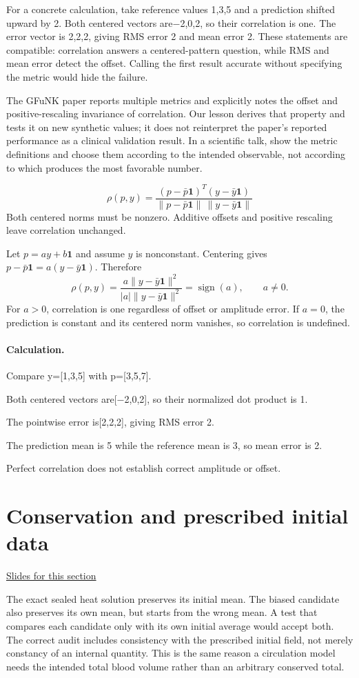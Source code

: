 \documentclass[11pt,letterpaper]{article}
\theoremstyle{definition}\newtheorem{definition}{Definition}\newtheorem{example}{Example}
\numberwithin{equation}{section}
\begin{document}
For a concrete calculation, take reference values 1,3,5 and a prediction shifted upward by 2. Both centered vectors are\ensuremath{-}2,0,2, so their correlation is one. The error vector is 2,2,2, giving RMS error 2 and mean error 2. These statements are compatible: correlation answers a centered-pattern question, while RMS and mean error detect the offset. Calling the first result accurate without specifying the metric would hide the failure.

The GFuNK paper reports multiple metrics and explicitly notes the offset and positive-rescaling invariance of correlation. Our lesson derives that property and tests it on new synthetic values; it does not reinterpret the paper's reported performance as a clinical validation result. In a scientific talk, show the metric definitions and choose them according to the intended observable, not according to which produces the most favorable number.

\[
\rho(p,y)=\frac{(p-\bar p\mathbf1)^T(y-\bar y\mathbf1)}{\|p-\bar p\mathbf1\|\,\|y-\bar y\mathbf1\|}
\]
Both centered norms must be nonzero. Additive offsets and positive rescaling leave correlation unchanged.

Let $p=ay+b\boldsymbol1$ and assume $y$ is nonconstant. Centering gives $p-\bar p\boldsymbol1=a(y-\bar y\boldsymbol1)$. Therefore
\[
 \rho(p,y)=\frac{a\|y-\bar y\boldsymbol1\|^2}{|a|\|y-\bar y\boldsymbol1\|^2}
 =\operatorname{sign}(a),\qquad a\ne0.
\]
For $a>0$, correlation is one regardless of offset or amplitude error. If $a=0$, the prediction is constant and its centered norm vanishes, so correlation is undefined.

\paragraph{Calculation.} Compare y=[1,3,5] with p=[3,5,7].

Both centered vectors are[\ensuremath{-}2,0,2], so their normalized dot product is 1.

The pointwise error is[2,2,2], giving RMS error 2.

The prediction mean is 5 while the reference mean is 3, so mean error is 2.

Perfect correlation does not establish correct amplitude or offset.
\section{Conservation and prescribed initial data}
\hypertarget{note-conservation-and-prescribed-initial-data}{}\label{note:conservation-and-prescribed-initial-data}
{\small \href{slides.html\#frame=conservation-relative-to-the-initial-prediction-panel-1\&step=1}{Slides for this section}}\par
The exact sealed heat solution preserves its initial mean. The biased candidate also preserves its own mean, but starts from the wrong mean. A test that compares each candidate only with its own initial average would accept both. The correct audit includes consistency with the prescribed initial field, not merely constancy of an internal quantity. This is the same reason a circulation model needs the intended total blood volume rather than an arbitrary conserved total.
\end{document}

